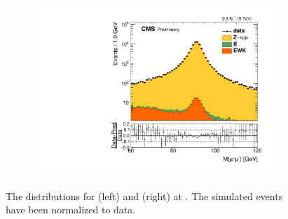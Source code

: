 \begin{figure}
\begin{subfigure}{.50\textwidth}
\end{subfigure}%
\centering
\begin{subfigure}{.50\textwidth}
\centering
\includegraphics[width=\linewidth]{plots/Z/5tev/zmmlog.pdf}
\end{subfigure}%
\caption{The \mll distributions for \zee (left) and \zmm (right) at \serag. The simulated events have been normalized to data.}
\label{fig:z:z:5}
\end{figure}